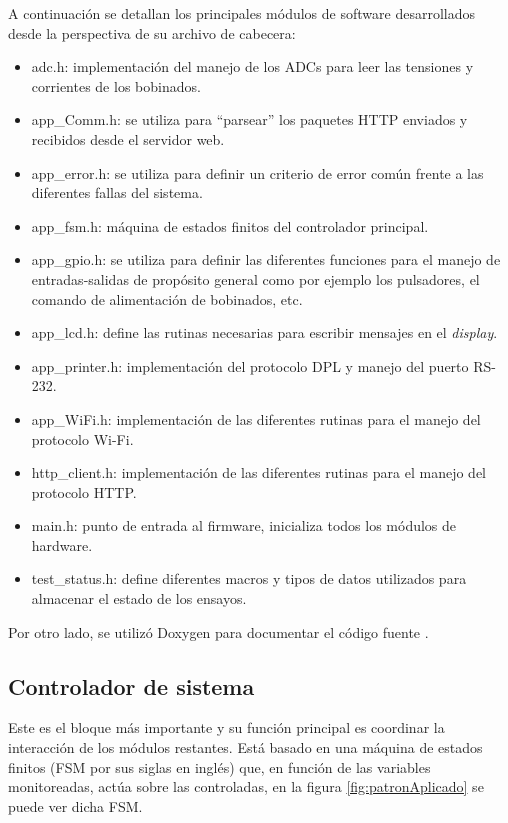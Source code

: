 A continuación se detallan los principales módulos de software desarrollados desde la perspectiva de su archivo de cabecera:

\begin{itemize}
\item adc.h: implementación del manejo de los ADCs para leer las tensiones y corrientes de los bobinados.
\item app\_Comm.h: se utiliza para ``parsear'' los paquetes HTTP enviados y recibidos desde el servidor web.
\item app\_error.h: se utiliza para definir un criterio de error común frente a las diferentes fallas del sistema.
\item app\_fsm.h: máquina de estados finitos del controlador principal.
\item app\_gpio.h: se utiliza para definir las diferentes funciones para el manejo de entradas-salidas de propósito general como por ejemplo los pulsadores, el comando de alimentación de bobinados, etc.
\item app\_lcd.h: define las rutinas necesarias para escribir mensajes en el \textit{display}.
\item app\_printer.h: implementación del protocolo DPL y manejo del puerto RS-232.
\item app\_WiFi.h: implementación de las diferentes rutinas para el manejo del protocolo Wi-Fi.
\item http\_client.h: implementación de las diferentes rutinas para el manejo del protocolo HTTP.
\item main.h: punto de entrada al firmware, inicializa todos los módulos de hardware.
\item test\_status.h: define diferentes macros y tipos de datos utilizados para almacenar el estado de los ensayos.
\end{itemize}

Por otro lado, se utilizó Doxygen para documentar el código fuente \citep{DOXYGEN}.

\subsection{Controlador de sistema}
\label{sec:ContSist}

Este es el bloque más importante y su función principal es coordinar la interacción de los módulos restantes. Está basado en una máquina de estados finitos (FSM por sus siglas en inglés) que, en función de las variables monitoreadas, actúa sobre las controladas, en la figura \ref{fig:patronAplicado} se puede ver dicha FSM.

